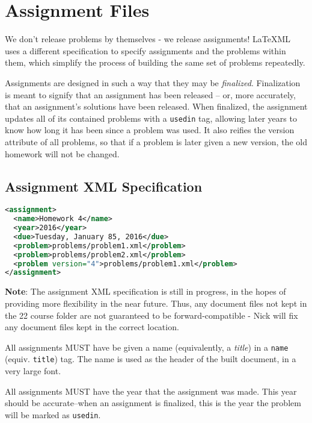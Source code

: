 \section{Assignment Files}
  We don't release problems by themselves - we release assignments! \LaTeX ML uses a different specification to specify assignments and the problems within them, which simplify the process of building the same set of problems repeatedly.
  
  Assignments are designed in such a way that they may be \textit{finalized}. Finalization is meant to signify that an assignment has been released -- or, more accurately, that an assignment's solutions have been released. When finalized, the assignment updates all of its contained problems with a \texttt{usedin} tag, allowing later years to know how long it has been since a problem was used. It also reifies the version attribute of all problems, so that if a problem is later given a new version, the old homework will not be changed.
  
  \subsection{Assignment XML Specification}
    \begin{mdframed}
      \begin{lstlisting}[language=XML,columns=fullflexible,breaklines=true]
<assignment>
  <name>Homework 4</name>
  <year>2016</year>
  <due>Tuesday, January 85, 2016</due>
  <problem>problems/problem1.xml</problem>
  <problem>problems/problem2.xml</problem>
  <problem version="4">problems/problem1.xml</problem>
</assignment>
      \end{lstlisting}
    \end{mdframed}
    
    \textbf{Note}: The assignment XML specification is still in progress, in the hopes of providing more flexibility in the near future. Thus, any document files not kept in the 22 course folder are not guaranteed to be forward-compatible - Nick will fix any document files kept in the correct location.
    
    All assignments MUST have be given a name (equivalently, a \textit{title}) in a \texttt{name} (equiv. \texttt{title}) tag. The name is used as the header of the built document, in a very large font.
    
    All assignments MUST have the year that the assignment was made. This year should be accurate--when an assignment is finalized, this is the year the problem will be marked as \texttt{usedin}.
    
